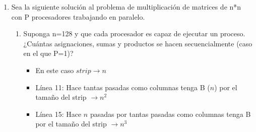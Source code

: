 \documentclass[a4paper, 10pt]{article}
\newenvironment{QandA}{
    \begin{enumerate}\bfseries}
    {\end{enumerate}
}
\newenvironment{answered}{\par\normalfont}{}
\begin{document}
\begin{QandA}
\begin{enumerate}
\begin{answered}
\begin{itemize}
\item Pipeline $\rightarrow$ la lógica en este algoritmo es la de comparar, realizar una asignación si corresponde, y enviar un mensaje. Por lo tanto, cada proceso hara tantas comparaciones como envío de mensajes:
\\
\begin{center}
    unidades de tiempo $\rightarrow 2 * \sum_{i=1}^n n-i $
\end{center}
\item Sort Merged Network $\rightarrow$ La lógica en este algoritmo, es similiar al pipeline (comparar, asignar y enviar). Por tal motivo, cada proceso hara tantas comparaciones como envío de mensajes:
\\
\begin{center}
    unidades de tiempo $\rightarrow 2 * (n * log_2 n)$
\end{center}

\item Odd/Even Exchange Sort $\rightarrow$ La lógica en este algoritmo, es similiar al pipeline (comparar, asignar y enviar). Por tal motivo, cada proceso hara tantas comparaciones como envío de mensajes:
\\
\begin{center}
    unidades de tiempo $\rightarrow 2 * (k^2 * \frac{n}{k+1})$
\end{center}
\end{itemize}  
\end{answered}
\end{enumerate}

\item Sea la siguiente solución al problema de multiplicación de matrices de n*n con P procesadores trabajando en paralelo.

\begin{enumerate}
\item Suponga n=128 y que cada procesador es capaz de ejecutar un proceso. ¿Cuántas asignaciones, sumas y productos se hacen secuencialmente (caso en el que P=1)?
\begin{answered}
\begin{itemize}
    \item En este caso $strip \rightarrow n$
    \item Línea 11: Hace tantas pasadas como columnas tenga B ($n$) por el tamaño del strip $\rightarrow n^2$
    \item Línea 15: Hace $n$ pasadas por tantas pasadas como columnas tenga B por el tamaño del strip $\rightarrow n^3$
\end{itemize}


\end{answered}
\end{enumerate}
\end{QandA}
\end{document}
